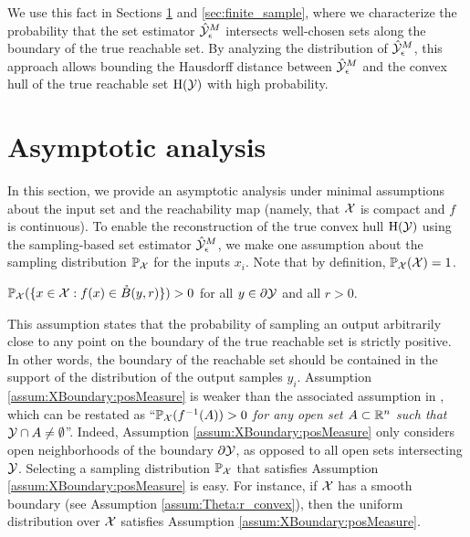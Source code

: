 \documentclass[12pt]{l4dc2022} %
\begin{document}
We use this fact in Sections \ref{sec:asymptotic} and \ref{sec:finite_sample}, where we %
characterize the probability that the set estimator $\hat{\mathcal{Y}}_\epsilon^M$ intersects well-chosen sets along the boundary of the true reachable set. 
% 
% 
% 
% 
% 
% 
% 
By analyzing the distribution of $\hat{\mathcal{Y}}_\epsilon^M$, 
% 
this approach allows bounding the Hausdorff distance between $\hat{\mathcal{Y}}_\epsilon^M$ and the convex hull of the true reachable set $\textrm{H}(\mathcal{Y})$ with high probability.











\vspace{-1mm}






\section{Asymptotic analysis}\label{sec:asymptotic}

In this section, we provide an asymptotic analysis under minimal assumptions about the input set and the reachability map (namely, that $\mathcal{X}$ is compact and $f$ is continuous). %
To enable the reconstruction of the true convex hull $\textrm{H}(\mathcal{Y})$ using the sampling-based set estimator $\hat{\mathcal{Y}}_\epsilon^M$, we make one assumption about the sampling distribution $\mathbb{P}_{\mathcal{X}}$ for the inputs $x_i$. Note that by definition, $\mathbb{P}_{\mathcal{X}}(\mathcal{X})=1$.

% 


\begin{myassumption}\label{assum:XBoundary:posMeasure} 
% 
% 
% 
$\mathbb{P}_{\mathcal{X}}(\{x\in\mathcal{X}: f(x)\in\mathring{B}(y,r)\})>0$  
for all $y\in\partial\mathcal{Y}$ and all $r>0$.
% 
% 
% 
% 
% 
% 
\end{myassumption}
This assumption states that the probability of sampling an output arbitrarily close to any point on the boundary of the true reachable set is strictly positive. 
% 
In other words, the boundary of the reachable set should be contained in the support of the distribution of the output samples $y_i$.  
% 
Assumption \ref{assum:XBoundary:posMeasure} is weaker than the associated assumption in \citep[Theorem 2]{LewPavone2020}, which can be restated as ``\textit{$\mathbb{P}_{\mathcal{X}}(f^{-1}(A))>0$ for any open set $A\subset\mathbb{R}^n$ such that $\mathcal{Y}\cap A\neq \emptyset$}''. 
Indeed, Assumption \ref{assum:XBoundary:posMeasure} only considers open neighborhoods of the boundary $\partial\mathcal{Y}$, as opposed to all open sets intersecting $\mathcal{Y}$. 
% 
% 
% 
% 
% 
% 
Selecting a sampling distribution $\mathbb{P}_{\mathcal{X}}$ that satisfies Assumption \ref{assum:XBoundary:posMeasure} is easy. For instance, if $\mathcal{X}$ has a smooth boundary (see Assumption \ref{assum:Theta:r_convex}), then the uniform distribution over $\mathcal{X}$ satisfies Assumption \ref{assum:XBoundary:posMeasure}. 
\end{document}
